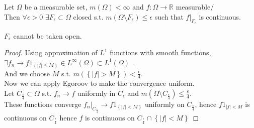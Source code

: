 \documentclass[../main.tex]{subfiles}
\begin{document}
\begin{thm}
	Let $\Omega$ be a measurable set, $m( \Omega) < \infty $ and $f: \Omega \to \mathbb{R}$ measurable/\\
	Then $\forall \epsilon>0$ $\exists F_\epsilon \subset \Omega$ closed s.t. $m( \Omega \setminus F_\epsilon) \leq \epsilon$ such that $f|_{F_\epsilon} $ is continuous.
\end{thm}
\begin{rmq}
$F_\epsilon$ cannot be taken open.
\end{rmq}
\begin{proof}
Using approximation of $L^{1}$ functions with smooth functions, $\exists f_n \to f 1_{ \left\{ |f| \leq M \right\} } \in L^{ \infty }( \Omega) \subset L^{1}( \Omega) $ .\\
And we choose $M$ s.t. $m(  \left\{ |f| >M \right\} ) < \frac{\epsilon}{4}$.\\
Now we can apply Egoroov to make the convergence uniform.\\
Let $C_{\frac{\epsilon}{4}} \subset \Omega$ s.t. $f_n\to f$ uniformly in $C_\epsilon$ and $m( \Omega\setminus C_{\frac{\epsilon}{4}} ) \leq \frac{\epsilon}{4}$.\\
These functions converge $ f_n |_{C_{\frac{\epsilon}{4}} } \to f 1_{ \left\{ |f| < M \right\} } $ uniformly on $C_{\frac{\epsilon}{4}} $, hence $f 1_{|f| <M} $ is continuous on $C_{\frac{\epsilon}{4}} $ hence $f$ is continuous on $C_{\frac{\epsilon}{4}} \cap \left\{ |f| <M \right\} $ 
\end{proof}
\end{document}
